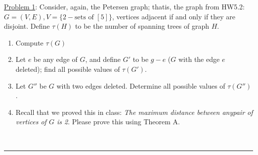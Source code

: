 \documentclass{article}
\newcommand{\statementsep}{\leavevmode\\[0.005in] \rule[\baselineskip/4]{\textwidth}{0.4pt}\leavevmode\\[0.005in]}
\begin{document}
\noindent\underline{Problem 1}: Consider, again, the Petersen graph; thatis, the graph from HW5.2: $G = (V,E), V=\{2-\text{sets of } [5]\}$, vertices adjacent if and only if they are disjoint. Define $\tau(H)$ to be the number of spanning trees of graph $H$. 
\begin{enumerate}
	\item Compute $\tau(G)$
	\item Let $e$ be any edge of $G$, and define $G'$ to be $g - e$  ($G$ with the edge $e$ deleted); find all possible values of $\tau(G')$.
	\item Let $G''$ be $G$ with two edges deleted. Determine all possible values of $\tau(G'')$.
	\item Recall that we proved this in class: {\it The maximum distance between anypair of vertices of $G$ is 2}. Please prove this using Theorem A.
\end{enumerate}
\statementsep
\end{document}
